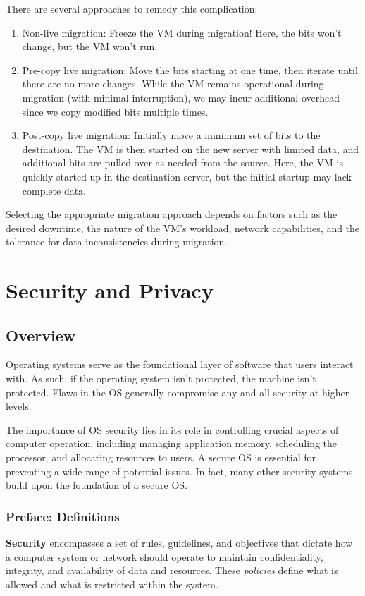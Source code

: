 \documentclass{report}
\newcommand{\definitionBegin}[1]{\begin{tcolorbox}[title={Definition: #1}]}
\newcommand{\definitionEnd}{\end{tcolorbox}}
\begin{document}
There are several approaches to remedy this complication:

\begin{enumerate}[label=\textit{(\roman*)}]
\item Non-live migration: Freeze the VM during migration! Here, the bits won't change, but the VM
  won't run.
\item Pre-copy live migration: Move the bits starting at one time, then iterate until there are no
  more changes. While the VM remains operational during migration (with minimal interruption), we
  may incur additional overhead since we copy modified bits multiple times.
\item Post-copy live migration: Initially move a minimum set of bits to the destination. The VM is
  then started on the new server with limited data, and additional bits are pulled over as needed
  from the source. Here, the VM is quickly started up in the destination server, but the initial
  startup may lack complete data.
\end{enumerate}

Selecting the appropriate migration approach depends on factors such as the desired downtime, the
nature of the VM's workload, network capabilities, and the tolerance for data inconsistencies during
migration. 










\chapter{Security and Privacy}
\section{Overview}
Operating systems serve as the foundational layer of software that users interact with. As such, if
the operating system isn't protected, the machine isn't protected. Flaws in the OS generally
compromise any and all security at higher levels.

The importance of OS security lies in its role in controlling crucial aspects of computer
operation, including managing application memory, scheduling the processor, and allocating
resources to users. A secure OS is essential for preventing a wide range of potential issues. In
fact, many other security systems build upon the foundation of a secure OS. 


\subsection{Preface: Definitions}
\definitionBegin{Security}
\textbf{Security} encompasses a set of rules, guidelines, and objectives that dictate how a computer
system or network should operate to maintain confidentiality, integrity, and availability of data
and resources. These \textit{policies} define what is allowed and what is restricted within the
system.
\definitionEnd
\end{document}
